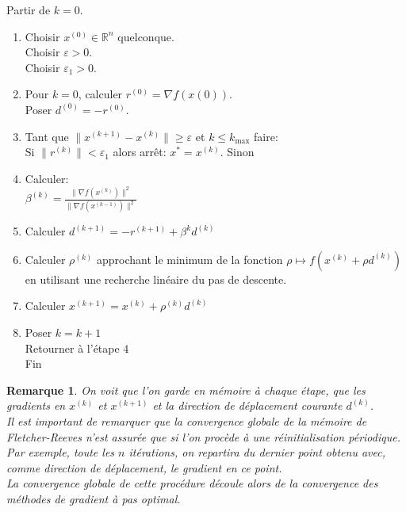 \documentclass[12pt,a4paper,openay]{book}
\numberwithin{equation}{chapter}
\newtheorem{rmq}{Remarque}[chapter]
\newcommand{\R}{\mathbb{R}}
\newcommand{\dk}{d^{(k)}}
\newcommand{\dks}{d^{(k+1)}}
\newcommand{\xk}{x^{(k)}}
\newcommand{\xks}{x^{(k+1)}}
\newcommand{\rk}{r^{(k)}}
\newcommand{\rks}{r^{(k+1)}}
\newcommand{\rok}{\rho^{(k)}}
\begin{document}
		Partir de $k=0$.
		\begin{enumerate}
			\item 	Choisir $x^{(0)}\in\R^n$ quelconque.\\
			Choisir $\varepsilon > 0.$\\
			Choisir $\varepsilon_{1} > 0.$
			\item 	Pour $k=0$, calculer $r^{(0)} = \nabla f\left(x{(0)}\right)$.\\
			Poser $d^{(0)} = -r^{(0)}$.
			\item  Tant que $\|\xks - \xk\|\geq\varepsilon$ et $k\leq k_{\max}$ faire:\\
			Si $\|\rk\| < \varepsilon_{1}$ alors arr\^et: $x^*  =\xk$. Sinon
			\item  Calculer:\\
			$\beta^{(k)} = \frac{\|\nabla f\left(\xk\right)\|^{2}}{\|\nabla f\left(x^{(k-1)}\right)\|^{2}}$\\
			\item Calculer $\dks=-\rks +\beta^k \dk$
			\item Calculer $\rok$ approchant le minimum de la fonction $\rho \mapsto f(\xk+\rho\dk)$ en utilisant une recherche lin\'eaire du pas de descente.
			\item Calculer $\xks =\xk+\rok\dk$
			\item  Poser $k=k+1$\\
			Retourner \`a l'\'etape $4$\\
			Fin		
		\end{enumerate}
	\begin{rmq}
	On voit que l'on garde en m\'emoire \`a chaque \'etape, que les gradients en $\xk$ et $\xks$ et la direction de d\'eplacement courante $\dk$.\\
	Il est important de remarquer que la convergence globale de la m\'emoire de Fletcher-Reeves n'est assur\'ee que si l'on proc\`ede \`a une r\'einitialisation p\'eriodique.\\
	Par exemple, toute les $n$ it\'erations, on repartira du dernier point obtenu avec, comme direction de d\'eplacement, le gradient en ce point.\\
	La convergence globale de cette proc\'edure d\'ecoule alors de la convergence des m\'ethodes de gradient \`a pas optimal.
	\end{rmq}
\end{document}
